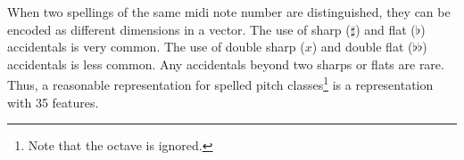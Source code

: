 
When two spellings of the same \gls{midi} note number are
distinguished, they can be encoded as different dimensions
in a vector. The use of sharp ($\sharp$) and flat ($\flat$)
accidentals is very common. The use of double sharp ($x$)
and double flat ($\flat\flat$) accidentals is less common.
Any accidentals beyond two sharps or flats are rare. Thus, a
reasonable representation for spelled pitch
classes\footnote{Note that the octave is ignored.} is a
representation with 35 features.